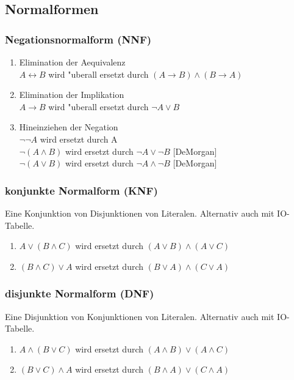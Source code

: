 \documentclass[11pt, a4paper,twocolumn]{scrartcl}
\begin{document}
\subsection{Normalformen}

\subsubsection{Negationsnormalform (NNF)}
 \begin{enumerate}
  \item Elimination der Aequivalenz\\
   $A \leftrightarrow B$ wird "uberall ersetzt durch $(A \rightarrow B)\land(B \rightarrow A)$
  \item Elimination der Implikation\\
   $A \rightarrow B$ wird "uberall ersetzt durch $\lnot A \lor B$
  \item Hineinziehen der Negation \\
   $\lnot\lnot A$ wird ersetzt durch A\\
   $\lnot(A \land B)$ wird ersetzt durch $\lnot A \lor \lnot B$ [DeMorgan]\\
   $\lnot(A \lor B)$ wird ersetzt durch $\lnot A \land \lnot B$ [DeMorgan]
 \end{enumerate}

\subsubsection{konjunkte Normalform (KNF)}
Eine Konjunktion von Disjunktionen von Literalen. Alternativ auch mit IO-Tabelle.


 \begin{enumerate}
  \item $A \lor (B \land C)$ wird ersetzt durch $(A \lor B)\land(A \lor C)$
  \item $(B \land C) \lor A$ wird ersetzt durch $(B \lor A)\land(C \lor A)$
 \end{enumerate}

\subsubsection{disjunkte Normalform (DNF)}
Eine Disjunktion von Konjunktionen von Literalen. Alternativ auch mit IO-Tabelle.


 \begin{enumerate}
  \item $A \land (B \lor C)$ wird ersetzt durch $(A \land B)\lor(A \land C)$
  \item $(B \lor C)\land A$ wird ersetzt durch $(B \land A)\lor(C \land A)$
 \end{enumerate}
\end{document}
